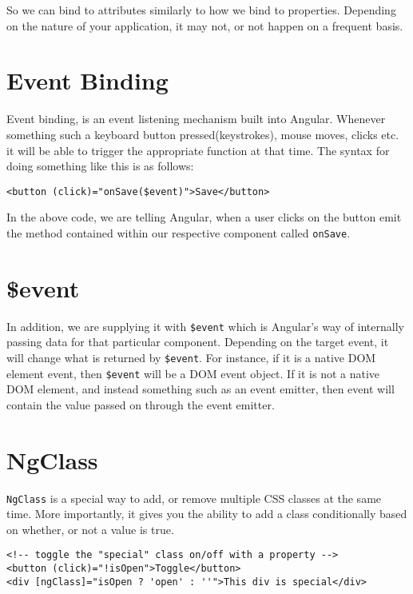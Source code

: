 So we can bind to attributes similarly to how we bind to properties. Depending
on the nature of your application, it may not, or not happen on a frequent 
basis.

\section{ Event Binding }
Event binding, is an event listening mechanism built into Angular. Whenever 
something such a keyboard button pressed(keystrokes), mouse moves, clicks etc. 
it will be able to trigger the appropriate function at that time. The syntax 
for doing something like this is as follows: 
\begin{lstlisting}
<button (click)="onSave($event)">Save</button> 
\end{lstlisting}

In the above code, we are telling Angular, when a user clicks on the button 
emit the method contained within our respective component called 
\lstinline{onSave}. 


\section{\$event}
In addition, we are supplying it with \lstinline{$event} which is Angular's way
of internally passing data for that particular component. Depending on the 
target event, it will change what is returned by \lstinline{$event}. For 
instance, if it is a native DOM element event, then \lstinline{$event} will be 
a DOM event object. If it is not a native DOM element, and instead something 
such as an event emitter, then event will contain the value passed on through 
the event emitter. 

\section{NgClass}
\lstinline{NgClass} is a special way to add, or remove multiple CSS classes 
at the same time. More importantly, it gives you the ability to add a class 
conditionally based on whether, or not a value is true. 
\begin{lstlisting}
<!-- toggle the "special" class on/off with a property -->
<button (click)="!isOpen">Toggle</button>
<div [ngClass]="isOpen ? 'open' : ''">This div is special</div>
\end{lstlisting}

